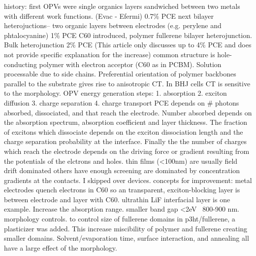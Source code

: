 \documentclass{article}
\begin{document}
history: 
first OPVs were single organics layers sandwiched between two metals with different work functions. (Evac - Efermi) 0.7\% PCE
next bilayer heterojuctions-- two organic layers between electrodes (e.g. perylene and phtalocyanine) 1\% PCE
C60 introduced, polymer fullerene bilayer heterojunction.
Bulk heterojunction 2\% PCE
(This article only discusses up to 4\% PCE and does not provide specific explanation for the increase)
common structure is hole-conducting polymer with electron acceptor (C60 as in PCBM). Solution processable due to side chains. Preferential orientation of polymer backbones parallel to the substrate gives rise to anisotropic CT. In BHJ cells CT is sensitive to the morphology.
OPV energy generation steps: 
1. absorption
2. exciton diffusion
3. charge separation
4. charge transport
PCE depends on # photons absorbed, dissociated, and that reach the electrode. Number absorbed depends on the absorption spectrum, absorption coefficient and layer thickness. The fraction of excitons which dissociate depends on the exciton dissociation length and the charge separation probability at the interface. Finally the the number of charges which reach the electrode depends on the driving force or gradient resulting from the potentials of the elctrons and holes. thin films (<100nm) are usually field drift dominated others have enough screening are dominated by concentration gradients at the contacts.
I skipped over devices.
concepts for improvement:
metal electrodes quench electrons in C60 so an transparent, exciton-blocking layer is between electrode and layer with C60. ultrathin LiF interfacial layer is one example. 
Increase the absorption range. smaller band gap <2eV ~800-900 nm.
morphology controls. to control size of fullerene domains in p3ht/fullerene, a plasticizer was added. This increase miscibility of polymer and fullerene creating smaller domains. Solvent/evaporation time, surface interaction, and annealing all have a large effect of the morphology.

\cite{Scharber2006a}
\cite{Yu1995}
\cite{Halls1995}
\cite{Kim2006}
\cite{Lee2011}
\cite{Huang2010}
\cite{Jankowski2013}
\cite{Marsh2014}
\cite{}
\cite{}
\cite{}
\cite{}
\cite{}
\cite{}
\cite{}
\cite{}
\cite{}
\cite{}
\cite{}
\cite{}



\end{document}
